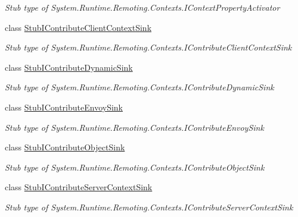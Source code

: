 \begin{DoxyCompactItemize}
\begin{DoxyCompactList}\small\item\em Stub type of System.\-Runtime.\-Remoting.\-Contexts.\-I\-Context\-Property\-Activator\end{DoxyCompactList}\item 
class \hyperlink{class_system_1_1_runtime_1_1_remoting_1_1_contexts_1_1_fakes_1_1_stub_i_contribute_client_context_sink}{Stub\-I\-Contribute\-Client\-Context\-Sink}
\begin{DoxyCompactList}\small\item\em Stub type of System.\-Runtime.\-Remoting.\-Contexts.\-I\-Contribute\-Client\-Context\-Sink\end{DoxyCompactList}\item 
class \hyperlink{class_system_1_1_runtime_1_1_remoting_1_1_contexts_1_1_fakes_1_1_stub_i_contribute_dynamic_sink}{Stub\-I\-Contribute\-Dynamic\-Sink}
\begin{DoxyCompactList}\small\item\em Stub type of System.\-Runtime.\-Remoting.\-Contexts.\-I\-Contribute\-Dynamic\-Sink\end{DoxyCompactList}\item 
class \hyperlink{class_system_1_1_runtime_1_1_remoting_1_1_contexts_1_1_fakes_1_1_stub_i_contribute_envoy_sink}{Stub\-I\-Contribute\-Envoy\-Sink}
\begin{DoxyCompactList}\small\item\em Stub type of System.\-Runtime.\-Remoting.\-Contexts.\-I\-Contribute\-Envoy\-Sink\end{DoxyCompactList}\item 
class \hyperlink{class_system_1_1_runtime_1_1_remoting_1_1_contexts_1_1_fakes_1_1_stub_i_contribute_object_sink}{Stub\-I\-Contribute\-Object\-Sink}
\begin{DoxyCompactList}\small\item\em Stub type of System.\-Runtime.\-Remoting.\-Contexts.\-I\-Contribute\-Object\-Sink\end{DoxyCompactList}\item 
class \hyperlink{class_system_1_1_runtime_1_1_remoting_1_1_contexts_1_1_fakes_1_1_stub_i_contribute_server_context_sink}{Stub\-I\-Contribute\-Server\-Context\-Sink}
\begin{DoxyCompactList}\small\item\em Stub type of System.\-Runtime.\-Remoting.\-Contexts.\-I\-Contribute\-Server\-Context\-Sink\end{DoxyCompactList}\item 

\end{DoxyCompactItemize}

